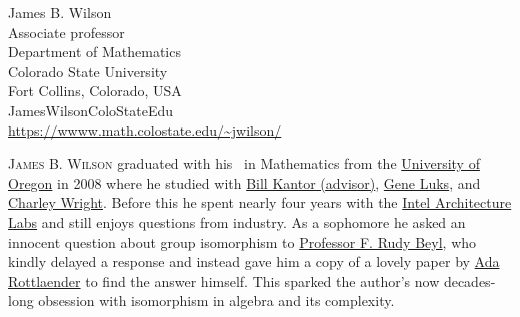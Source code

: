 \documentclass{toc}
\numberwithin{equation}{section}
\theoremstyle{plain}       %
\theoremstyle{remark}
\theoremstyle{definition}
\numberwithin{figure}{section}
\numberwithin{table}{section}
\begin{document}

%
%
%
%


%
%
%
%
%
\begin{tocauthors}
\begin{tocinfo}[wilson]
 James B. Wilson\\
 Associate professor\\
 Department of Mathematics\\
 Colorado State University\\
 Fort Collins, Colorado, USA\\
 James\tocdot{}Wilson\tocat{}ColoState\tocdot{}Edu\\   %
 \url{https://wwww.math.colostate.edu/~jwilson/}      %
\end{tocinfo}
\end{tocauthors}

%
%
%
%
%
%
%
%
%
%
%
%
%
%
\begin{tocaboutauthors}
\begin{tocabout}[wilson]  %
  \textsc{James B. Wilson} graduated with his \phd\ in Mathematics from
  the  %
  \href{https://www.uoregon.edu}{University of Oregon} in 2008 where he studied
  with \href{https://en.wikipedia.org/wiki/William_Kantor}{Bill Kantor
  (advisor)}, \href{https://en.wikipedia.org/wiki/Eugene_M._Luks}{Gene Luks},
  and \href{https://pages.uoregon.edu/wright/research.html}{Charley Wright}.
  Before this he spent nearly four years with the
  \href{https://en.wikipedia.org/wiki/Intel_Architecture_Labs}{Intel
  Architecture Labs} and still enjoys questions from industry.  As a sophomore
  he asked an innocent question about group isomorphism to
  \href{https://www.pdx.edu/math/rudy-beyl}{Professor F. Rudy Beyl}, who kindly
  delayed a response and instead gave him a copy of a lovely paper by 
  \href{https://doi.org/10.1007/BF01181188}{Ada Rottlaender}
  to find the answer 
  himself.  This sparked the author's now
  decades-long   %
  obsession with isomorphism in algebra and its complexity.
\end{tocabout}
\end{tocaboutauthors}
\end{document}

